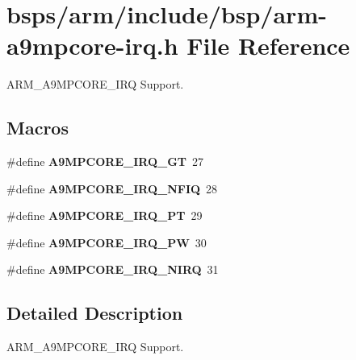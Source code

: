 \hypertarget{arm-a9mpcore-irq_8h}{}\section{bsps/arm/include/bsp/arm-\/a9mpcore-\/irq.h File Reference}
\label{arm-a9mpcore-irq_8h}


A\+R\+M\+\_\+\+A9\+M\+P\+C\+O\+R\+E\+\_\+\+I\+RQ Support.  


\subsection*{Macros}
\begin{DoxyCompactItemize}
\item 
\mbox{\label{arm-a9mpcore-irq_8h_a2557306c04edb0c0795ab5145ad58e3d}} 
\#define {\bfseries A9\+M\+P\+C\+O\+R\+E\+\_\+\+I\+R\+Q\+\_\+\+GT}~27
\item 
\mbox{\label{arm-a9mpcore-irq_8h_aaad93deda4c6dc26c84d6d8d917f1f28}} 
\#define {\bfseries A9\+M\+P\+C\+O\+R\+E\+\_\+\+I\+R\+Q\+\_\+\+N\+F\+IQ}~28
\item 
\mbox{\label{arm-a9mpcore-irq_8h_a1442f14b1e892e85e17a41e3ef8b9c41}} 
\#define {\bfseries A9\+M\+P\+C\+O\+R\+E\+\_\+\+I\+R\+Q\+\_\+\+PT}~29
\item 
\mbox{\label{arm-a9mpcore-irq_8h_a794f5e3e73987f494c8d0b54bae3e30d}} 
\#define {\bfseries A9\+M\+P\+C\+O\+R\+E\+\_\+\+I\+R\+Q\+\_\+\+PW}~30
\item 
\mbox{\label{arm-a9mpcore-irq_8h_aebe09f3675abb1ceb1d02c4ebef75bb1}} 
\#define {\bfseries A9\+M\+P\+C\+O\+R\+E\+\_\+\+I\+R\+Q\+\_\+\+N\+I\+RQ}~31
\end{DoxyCompactItemize}


\subsection{Detailed Description}
A\+R\+M\+\_\+\+A9\+M\+P\+C\+O\+R\+E\+\_\+\+I\+RQ Support. 

